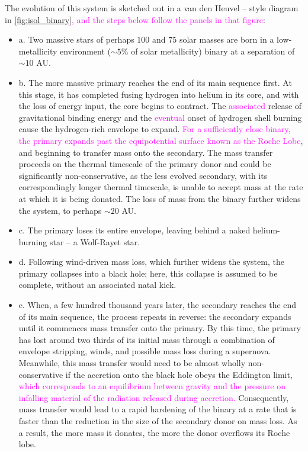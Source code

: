 \documentclass[iop,onecolumn]{revtex4}
\newcommand{\ilya}[1]{\textcolor{magenta}{#1}}
\begin{document}
The evolution of this system is sketched out in a van den Heuvel -- style diagram in \autoref{fig:isol_binary}\ilya{, and the steps below follow the panels in that figure}:
\begin{itemize}  
\item{a.} Two massive stars of perhaps $100$ and $75$ solar masses are born in a low-metallicity environment ($\sim 5\%$ of solar metallicity)  binary at a separation of $\sim 10$ AU.  
\item{b.} The more massive primary reaches the end of its main sequence first.  At this stage, it has completed fusing hydrogen into helium in its core, and with the loss of energy input, the core begins to contract.  The \ilya{associated} release of gravitational binding energy and the \ilya{eventual} onset of hydrogen shell burning cause the hydrogen-rich envelope to expand.  \ilya{For a sufficiently close binary, the primary expands past the equipotential surface known as the Roche Lobe}, and beginning to transfer mass onto the secondary.  The mass transfer proceeds on the thermal timescale of the primary donor and could be significantly non-conservative, as the less evolved secondary, with its correspondingly longer thermal timescale, is unable to accept mass at the rate at which it is being donated.  The loss of mass from the binary further widens the system, to perhaps $\sim 20$ AU.  
\item{c.} The primary loses its entire envelope, leaving behind a naked helium-burning star -- a Wolf-Rayet star.  
\item{d.} Following wind-driven mass loss, which further widens the system, the primary collapses into a black hole; here, this collapse is assumed to be complete, without an associated natal kick.  
\item{e.} When, a few hundred thousand years later, the secondary reaches the end of its main sequence, the process repeats in reverse: the secondary expands until it commences mass transfer onto the primary.  By this time, the primary has lost around two thirds of its initial mass through a combination of envelope stripping, winds, and possible mass loss during a supernova.  Meanwhile, this mass transfer would need to be almost wholly non-conservative if the accretion onto the black hole obeys the Eddington limit, \ilya{which corresponds to an equilibrium between gravity and the pressure on infalling material of the radiation released during accretion.}  Consequently, mass transfer would lead to a rapid hardening of the binary at a rate that is faster than the reduction in the size of the secondary donor on mass loss.  As a result, the more mass it donates, the more the donor overflows its Roche lobe.  

\end{itemize}
\end{document}
